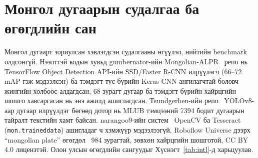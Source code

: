 \section{Монгол дугаарын судалгаа ба өгөгдлийн сан}
Монгол дугаарт зориулсан хэвлэгдсэн судалгааны өгүүлэл, нийтийн benchmark олдсонгүй. Нээлттэй кодын хувьд gumbernator-ийн Mongolian-ALPR~\cite{gumbernator} репо нь TensorFlow Object Detection API-ийн SSD/Faster R-CNN илрүүлэгч (66--72 mAP гэж мэдээлсэн) ба тэмдэгт тус бүрийн Keras CNN ангилагчтай боловч жингийн холбоос алдагдсан; 68 зурагт дугаар ба тэмдэгт бүрийн хайрцгийн шошго хавсаргасан нь энэ ажилд ашиглагдсан. Tsundgerhen-ийн репо~\cite{tsund} YOLOv8-аар дугаар илрүүлдэг бөгөөд дотор нь MLUB тэмцээний 7394 бодит дугаарын тайралт текстийн хамт байсан. narangoo9-ийн систем~\cite{narangoo} OpenCV ба Tesseract (\texttt{mon.traineddata}) ашигладаг ч хэмжүүр мэдээлээгүй. Roboflow Universe дээрх ``mongolian plate'' өгөгдөл~\cite{roboflowmn} 984 зурагтай, зөвхөн хайрцгийн шошготой, CC BY 4.0 лицензтэй. Олон улсын өгөгдлийн сангуудыг Хүснэгт~\ref{tab:intl}-д харьцуулав.
\begin{table}[H]\centering\caption{Дугаар таних олон улсын гол өгөгдлийн сангууд ба монгол эх үүсвэрүүд}\label{tab:intl}\small
{}\end{table}
